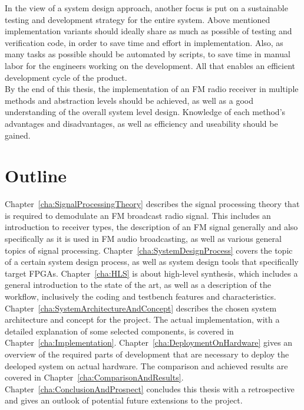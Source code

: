 In the view of a system design approach, another focus is put on a sustainable testing and development strategy for the entire system.
Above mentioned implementation variants should ideally share as much as possible of testing and verification code, in order to save time and effort in implementation.
Also, as many tasks as possible should be automated by scripts, to save time in manual labor for the engineers working on the development.
All that enables an efficient development cycle of the product.\\

By the end of this thesis, the implementation of an FM radio receiver in multiple methods and abstraction levels should be achieved, as well as a good understanding of the overall system level design.
Knowledge of each method's advantages and disadvantages, as well as efficiency and useability should be gained.


\section{Outline}

Chapter~\ref{cha:SignalProcessingTheory} describes the signal processing theory that is required to demodulate an FM broadcast radio signal.
This includes an introduction to receiver types, the description of an FM signal generally and also specifically as it is used in FM audio broadcasting, as well as various general topics of signal processing.
Chapter~\ref{cha:SystemDesignProcess} covers the topic of a certain system design process, as well as system design tools that specifically target FPGAs.
Chapter~\ref{cha:HLS} is about high-level synthesis, which includes a general introduction to the state of the art, as well as a description of the workflow, inclusively the coding and testbench features and characteristics.
Chapter~\ref{cha:SystemArchitectureAndConcept} describes the chosen system architecture and concept for the project.
The actual implementation, with a detailed explanation of some selected components, is covered in Chapter~\ref{cha:Implementation}.
Chapter~\ref{cha:DeploymentOnHardware} gives an overview of the required parts of development that are necessary to deploy the deeloped system on actual hardware.
The comparison and achieved results are covered in Chapter~\ref{cha:ComparisonAndResults}.
Chapter~\ref{cha:ConclusionAndProspect} concludes this thesis with a retrospective and gives an outlook of potential future extensions to the project.


